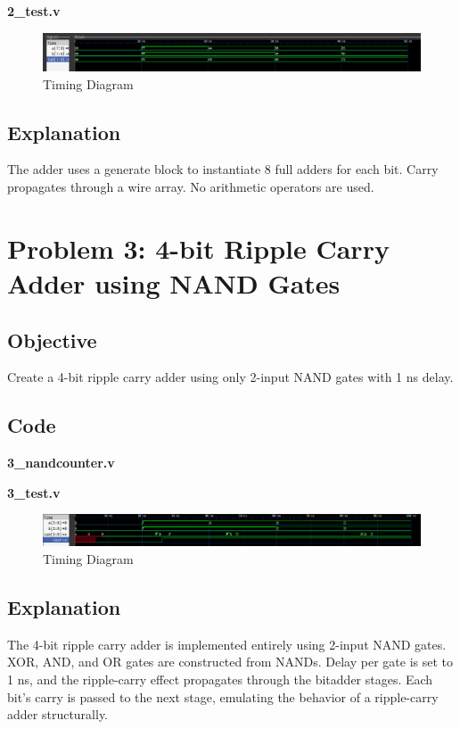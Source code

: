 \documentclass[12pt]{article}
\begin{document}
\textbf{2\_test.v}

\begin{figure}[H]
    \centering
    \includegraphics[width=\textwidth]{figs/2/test.png} 
    \caption{Timing Diagram}
\end{figure}
\subsection*{Explanation}
The adder uses a generate block to instantiate 8 full adders for each bit. Carry propagates through a wire array. No arithmetic operators are used.

\section{Problem 3: 4-bit Ripple Carry Adder using NAND Gates}
\subsection*{Objective}
Create a 4-bit ripple carry adder using only 2-input NAND gates with 1 ns delay.

\subsection*{Code}
\textbf{3\_nandcounter.v}


\textbf{3\_test.v}

\begin{figure}[H]
    \centering
    \includegraphics[width=\textwidth]{figs/3/test.png} 
    \caption{Timing Diagram}
\end{figure}
\subsection*{Explanation}
The 4-bit ripple carry adder is implemented entirely using 2-input NAND gates. XOR, AND, and OR gates are constructed from NANDs. Delay per gate is set to 1 ns, and the ripple-carry effect propagates through the bitadder stages. Each bit's carry is passed to the next stage, emulating the behavior of a ripple-carry adder structurally.
\end{document}
